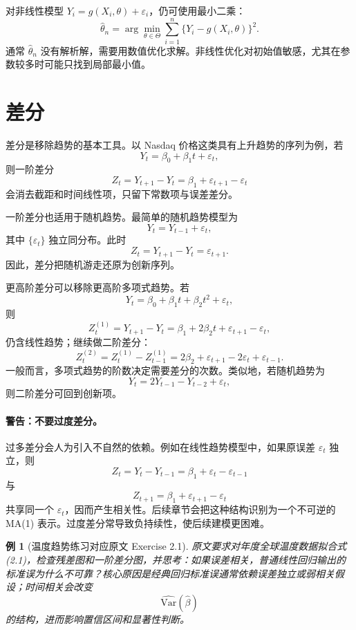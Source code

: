 \documentclass[11pt,a4paper]{ctexart}
\newtheorem{example}{例}[section]
\begin{document}
对非线性模型 \(Y_i=g(X_i,\theta)+\varepsilon_i\)，仍可使用最小二乘：
\[
  \hat{\theta}_n
  =\arg\min_{\theta\in\Theta}
  \sum_{i=1}^n\{Y_i-g(X_i,\theta)\}^2.
\]
通常 \(\hat{\theta}_n\) 没有解析解，需要用数值优化求解。非线性优化对初始值敏感，尤其在参数较多时可能只找到局部最小值。

\section{差分}

差分是移除趋势的基本工具。以 Nasdaq 价格这类具有上升趋势的序列为例，若
\[
  Y_t=\beta_0+\beta_1t+\varepsilon_t,
\]
则一阶差分
\[
  Z_t=Y_{t+1}-Y_t=\beta_1+\varepsilon_{t+1}-\varepsilon_t
\]
会消去截距和时间线性项，只留下常数项与误差差分。

一阶差分也适用于随机趋势。最简单的随机趋势模型为
\begin{equation}
  Y_t=Y_{t-1}+\varepsilon_t, \tag{2.7}
\end{equation}
其中 \(\{\varepsilon_t\}\) 独立同分布。此时
\[
  Z_t=Y_{t+1}-Y_t=\varepsilon_{t+1}.
\]
因此，差分把随机游走还原为创新序列。

更高阶差分可以移除更高阶多项式趋势。若
\[
  Y_t=\beta_0+\beta_1t+\beta_2t^2+\varepsilon_t,
\]
则
\[
  Z_t^{(1)}=Y_{t+1}-Y_t=\beta_1+2\beta_2t+\varepsilon_{t+1}-\varepsilon_t,
\]
仍含线性趋势；继续做二阶差分：
\[
  Z_t^{(2)}=Z_t^{(1)}-Z_{t-1}^{(1)}
  =2\beta_2+\varepsilon_{t+1}-2\varepsilon_t+\varepsilon_{t-1}.
\]
一般而言，多项式趋势的阶数决定需要差分的次数。类似地，若随机趋势为
\[
  Y_t=2Y_{t-1}-Y_{t-2}+\varepsilon_t,
\]
则二阶差分可回到创新项。

\paragraph{警告：不要过度差分。}
过多差分会人为引入不自然的依赖。例如在线性趋势模型中，如果原误差 \(\varepsilon_t\) 独立，则
\[
  Z_t=Y_t-Y_{t-1}=\beta_1+\varepsilon_t-\varepsilon_{t-1}
\]
与
\[
  Z_{t+1}=\beta_1+\varepsilon_{t+1}-\varepsilon_t
\]
共享同一个 \(\varepsilon_t\)，因而产生相关性。后续章节会把这种结构识别为一个不可逆的 MA(1) 表示。过度差分常导致负持续性，使后续建模更困难。

\begin{example}[温度趋势练习对应原文 Exercise 2.1]
原文要求对年度全球温度数据拟合式 (2.1)，检查残差图和一阶差分图，并思考：如果误差相关，普通线性回归输出的标准误为什么不可靠？核心原因是经典回归标准误通常依赖误差独立或弱相关假设；时间相关会改变
\[
  \widehat{\mathrm{Var}}(\hat{\beta})
\]
的结构，进而影响置信区间和显著性判断。
\end{example}
\end{document}
